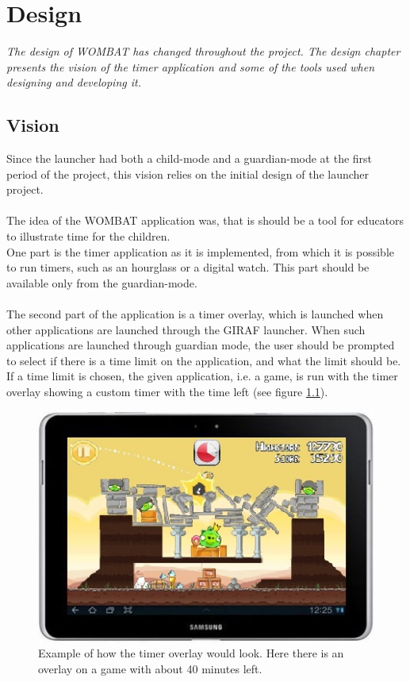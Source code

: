 \chapter{Design}
\textit{The design of WOMBAT has changed throughout the project. The design chapter presents the vision of the timer application and some of the tools used when designing and developing it.} %

\section{Vision}
\label{sec:vision}
Since the launcher had both a child-mode and a guardian-mode at the first period of the project, this vision relies on the initial design of the launcher project.\\ \\
	The idea of the WOMBAT application was, that is should be a tool for educators to illustrate time for the children.\\
	
One part is the timer application as it is implemented, from which it is possible to run timers, such as an hourglass or a digital watch. This part should be available only from the guardian-mode.\\ \\
  The second part of the application is a timer overlay, which is launched when other applications are launched through the GIRAF launcher. When such applications are launched through guardian mode, the user should be prompted to select if there is a time limit on the application, and what the limit should be. If a time limit is chosen, the given application, i.e. a game, is run with the timer overlay showing a custom timer with the time left (see figure \ref{fig:init_overlay_drawings}).
	
	\begin{figure}[H]
		\centering
			\includegraphics[width=\textwidth]{Images/paper_prototype/overlay.png}
				\caption{Example of how the timer overlay would look. Here there is an overlay on a game with about 40 minutes left.}
		\label{fig:init_overlay_drawings}
	\end{figure}
	
